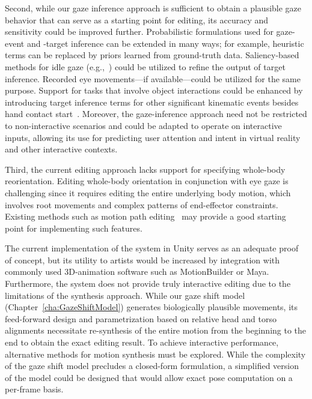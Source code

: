 Second, while our gaze inference approach is sufficient to obtain a plausible gaze behavior that can serve as a starting point for editing, its accuracy and sensitivity could be improved further. Probabilistic formulations used for gaze-event and -target inference can be extended in many ways; for example, heuristic terms can be replaced by priors learned from ground-truth data. Saliency-based methods for idle gaze (e.g.,~\citet{peters2003bottomup}) could be utilized to refine the output of target inference. Recorded eye movements---if available---could be utilized for the same purpose.
Support for tasks that involve object interactions could be enhanced by introducing target inference terms for other significant kinematic events besides hand contact start~\citep{johansson2001eyehead}.
Moreover, the gaze-inference approach need not be restricted to non-interactive scenarios and could be adapted to operate on interactive inputs, allowing its use for predicting user attention and intent in virtual reality and other interactive contexts.

Third, the current editing approach lacks support for specifying whole-body reorientation. Editing whole-body orientation in conjunction with eye gaze is challenging since it requires editing the entire underlying body motion, which involves root movements and complex patterns of end-effector constraints. Existing methods such as motion path editing~\citep{gleicher2001path} may provide a good starting point for implementing such features.

The current implementation of the system in Unity serves as an adequate proof of concept, but its utility to artists would be increased by integration with commonly used 3D-animation software such as MotionBuilder or Maya. Furthermore, the system does not provide truly interactive editing due to the limitations of the synthesis approach. While our gaze shift model (Chapter~\ref{cha:GazeShiftModel}) generates biologically plausible movements, its feed-forward design and parametrization based on relative head and torso alignments necessitate re-synthesis of the entire motion from the beginning to the end to obtain the exact editing result. To achieve interactive performance, alternative methods for motion synthesis must be explored. While the complexity of the gaze shift model precludes a closed-form formulation, a simplified version of the model could be designed that would allow exact pose computation on a per-frame basis.
